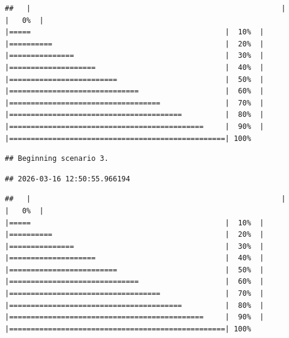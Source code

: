 \documentclass[
]{article}
\begin{document}
\begin{verbatim}
##   |                                                          |                                                  |   0%  |                                                          |=====                                             |  10%  |                                                          |==========                                        |  20%  |                                                          |===============                                   |  30%  |                                                          |====================                              |  40%  |                                                          |=========================                         |  50%  |                                                          |==============================                    |  60%  |                                                          |===================================               |  70%  |                                                          |========================================          |  80%  |                                                          |=============================================     |  90%  |                                                          |==================================================| 100%
\end{verbatim}

\begin{verbatim}
## Beginning scenario 3.
\end{verbatim}

\begin{verbatim}
## 2026-03-16 12:50:55.966194
\end{verbatim}

\begin{verbatim}
##   |                                                          |                                                  |   0%  |                                                          |=====                                             |  10%  |                                                          |==========                                        |  20%  |                                                          |===============                                   |  30%  |                                                          |====================                              |  40%  |                                                          |=========================                         |  50%  |                                                          |==============================                    |  60%  |                                                          |===================================               |  70%  |                                                          |========================================          |  80%  |                                                          |=============================================     |  90%  |                                                          |==================================================| 100%
\end{verbatim}
\end{document}
